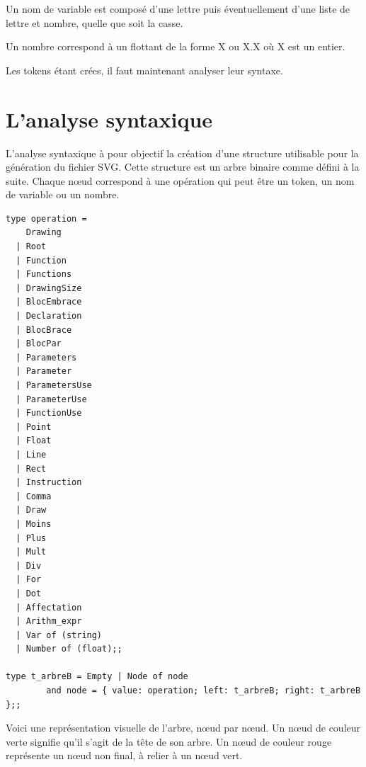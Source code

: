 \documentclass[11pt]{report} %
\begin{document}
Un nom de variable est composé d'une lettre puis éventuellement d'une liste de lettre et nombre, quelle que soit la casse.

Un nombre correspond à un flottant de la forme X ou X.X où X est un entier.

Les tokens étant crées, il faut maintenant analyser leur syntaxe.

\section{L'analyse syntaxique}
L'analyse syntaxique à pour objectif la création d'une structure utilisable pour la génération du fichier SVG. Cette structure est un arbre binaire comme défini à la suite. Chaque n{\oe}ud correspond à une opération qui peut être un token, un nom de variable ou un nombre.

\begin{lstlisting}[caption=Type arbre, language=caml]
type operation =
    Drawing
  | Root
  | Function
  | Functions
  | DrawingSize
  | BlocEmbrace
  | Declaration
  | BlocBrace
  | BlocPar
  | Parameters
  | Parameter
  | ParametersUse
  | ParameterUse
  | FunctionUse
  | Point
  | Float
  | Line
  | Rect
  | Instruction
  | Comma
  | Draw
  | Moins
  | Plus
  | Mult
  | Div
  | For
  | Dot
  | Affectation
  | Arithm_expr
  | Var of (string)
  | Number of (float);;
  
type t_arbreB = Empty | Node of node
        and node = { value: operation; left: t_arbreB; right: t_arbreB };;
\end{lstlisting}

Voici une représentation visuelle de l'arbre,  n{\oe}ud par  n{\oe}ud. Un n{\oe}ud de couleur verte signifie qu'il s'agit de la tête de son arbre. Un n{\oe}ud de couleur rouge représente un n{\oe}ud non final, à relier à un n{\oe}ud vert.
\end{document}
